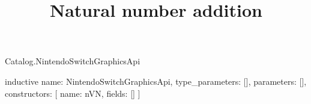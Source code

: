 \begin{lexlean}{Catalog.NintendoSwitchGraphicsApi}
\title{Natural number addition}
\begin{semanticmodule}
inductive{
  name: NintendoSwitchGraphicsApi,
  type_parameters: [],
  parameters: [],
  constructors: [
    {name: nVN, fields: []}
  ]
}
\end{semanticmodule}
\end{lexlean}
